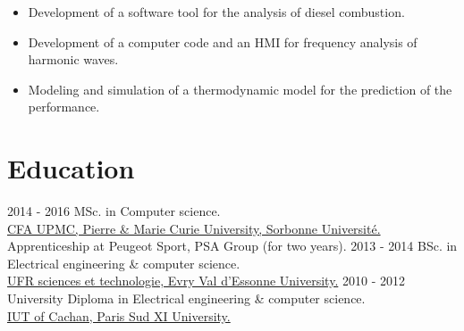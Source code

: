 \documentclass[letterpaper]{twentysecondcv} %
\begin{document}
\begin{twenty}
{{        \begin{itemize}
        \item Development of a software tool for the analysis of diesel combustion.
        \item Development of a computer code and an HMI for frequency analysis of harmonic waves.
        \item Modeling and simulation of a thermodynamic model for the prediction of the performance.
    \end{itemize}}
    
        }
        
        
       
\end{twenty}
\section{Education}

\begin{twenty} %
	\twentyitem
    	{2014 - 2016}
        {MSc. in Computer science.\\}
        {\href{http://www.upmc.fr/fr/universite.html}{CFA UPMC, Pierre \& Marie Curie University, Sorbonne Université.}}
        {Apprenticeship at Peugeot Sport, PSA Group (for two years).}
        {}
	\twentyitem
    	{2013 - 2014}
        {BSc. in Electrical engineering \& computer science.\\}
        {\href{http://www.upmc.fr/fr/universite.html}{UFR sciences et technologie, Evry Val d'Essonne University.}}
        {}
        {}
	\twentyitem
    	{2010 - 2012}
        {University Diploma in Electrical engineering \& computer science.}
        {\href{http://www.iut-cachan.u-psud.fr/fr/index.html}{\\IUT of Cachan, Paris Sud XI University.}}
        {}
        {}       
\end{twenty}
\end{document}
